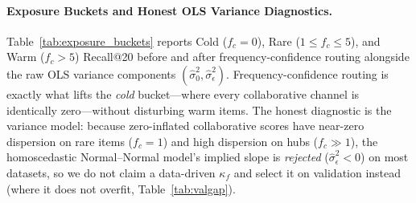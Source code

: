 \paragraph{Exposure Buckets and Honest OLS Variance Diagnostics.}
Table~\ref{tab:exposure_buckets} reports Cold ($f_c = 0$), Rare ($1 \le f_c \le 5$), and Warm ($f_c > 5$) Recall@20
before and after frequency-confidence routing alongside the raw OLS variance components $(\hat{\sigma}_0^2,
\hat{\sigma}_\epsilon^2)$. Frequency-confidence routing is exactly what lifts the \emph{cold} bucket---where every
collaborative channel is identically zero---without disturbing warm items. The honest diagnostic is the variance
model: because zero-inflated collaborative scores have near-zero dispersion on rare items ($f_c=1$) and high
dispersion on hubs ($f_c \gg 1$), the homoscedastic Normal--Normal model's implied slope is \emph{rejected}
($\hat{\sigma}_\epsilon^2 < 0$) on most datasets, so we do not claim a data-driven $\kappa_f$ and select it on
validation instead (where it does not overfit, Table~\ref{tab:valgap}).

